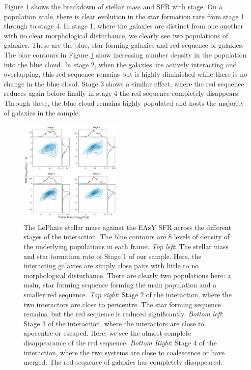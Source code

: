 Figure \ref{fig:sfr-mass} shows the breakdown of stellar mass and SFR with stage. On a population scale, there is clear evolution in the star formation rate from stage 1 through to stage 4. In stage 1, where the galaxies are distinct from one another with no clear morphological disturbance, we clearly see two populations of galaxies. These are the blue, star-forming galaxies and red sequence of galaxies. The blue contours in Figure \ref{fig:sfr-mass} show increasing number density in the population into the blue cloud. In stage 2, when the galaxies are actively interacting and overlapping, this red sequence remains but is highly diminished while there is no change in the blue cloud. Stage 3 shows a similar effect, where the red sequence reduces again before finally in stage 4 the red sequence completely disappears. Through these, the blue cloud remains highly populated and hosts the majority of galaxies in the sample.

\begin{figure}
    \centering
    \includegraphics[width = 0.45\textwidth]{Chapter3/figures/sfr-mass-stages.pdf}
    \caption{The LePhare stellar mass against the EAzY SFR across the different stages of the interaction. The blue contours are 8 levels of density of the underlying populations in each frame. \textit{Top left}: The stellar mass and star formation rate of Stage 1 of our sample. Here, the interacting galaxies are simply close pairs with little to no morphological disturbance. There are clearly two populations here: a main, star forming sequence forming the main population and a smaller red sequence. \textit{Top right}: Stage 2 of the interaction, where the two interactors are close to pericentre. The star forming sequence remains, but the red sequence is reduced significantly. \textit{Bottom left}: Stage 3 of the interaction, where the interactors are close to apocentre or escaped. Here, we see the almost complete disappearance of the red sequence. \textit{Bottom Right}: Stage 4 of the interaction, where the two systems are close to coalescence or have merged. The red sequence of galaxies has completely disappeared.}
    \label{fig:sfr-mass}
\end{figure}

